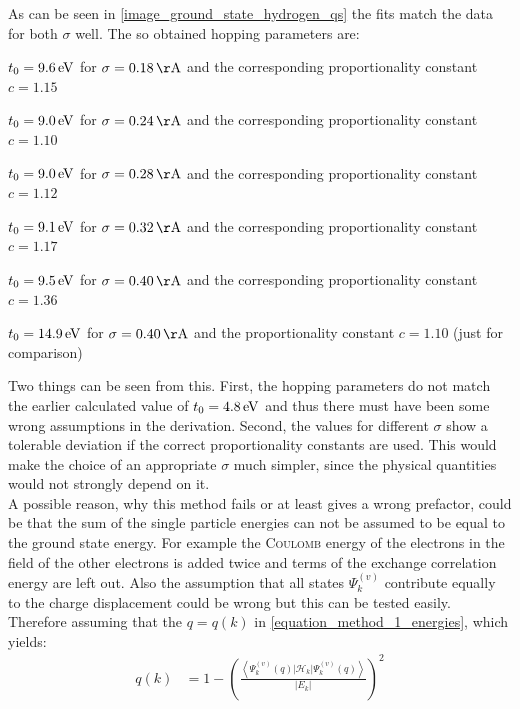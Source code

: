 As can be seen in \cref{image_ground_state_hydrogen_qs} the fits match the data for both $\sigma$ well. The so obtained hopping parameters are:
\begin{compactitem}
	\item $t_0 = \unit[9.6]{eV}$ for $\sigma = \unit[0.18]{\AA}$ and the corresponding proportionality constant $c = 1.15$
	\item $t_0 = \unit[9.0]{eV}$ for $\sigma = \unit[0.24]{\AA}$ and the corresponding proportionality constant $c = 1.10$
	\item $t_0 = \unit[9.0]{eV}$ for $\sigma = \unit[0.28]{\AA}$ and the corresponding proportionality constant $c = 1.12$
	\item $t_0 = \unit[9.1]{eV}$ for $\sigma = \unit[0.32]{\AA}$ and the corresponding proportionality constant $c = 1.17$
	\item $t_0 = \unit[9.5]{eV}$ for $\sigma = \unit[0.40]{\AA}$ and the corresponding proportionality constant $c = 1.36$
	\item $t_0 = \unit[14.9]{eV}$ for $\sigma = \unit[0.40]{\AA}$ and the proportionality constant $c = 1.10$ (just for comparison)
\end{compactitem}
Two things can be seen from this. First, the hopping parameters do not match the earlier calculated value of $t_0 = \unit[4.8]{eV}$ and thus there must have been some wrong assumptions in the derivation. Second, the values for different $\sigma$ show a tolerable deviation if the correct proportionality constants are used. This would make the choice of an appropriate $\sigma$ much simpler, since the physical quantities would not strongly depend on it.\\
A possible reason, why this method fails or at least gives a wrong prefactor, could be that the sum of the single particle energies can not be assumed to be equal to the ground state energy. For example the \textsc{Coulomb} energy of the electrons in the field of the other electrons is added twice and terms of the exchange correlation energy are left out. Also the assumption that all states $\Psi_k^{(v)}$ contribute equally to the charge displacement could be wrong but this can be tested easily. Therefore assuming that the $q = q(k)$ in \cref{equation_method_1_energies}, which yields:
\begin{align}
	q(k) &= 1 - \left(\frac{\left\langle\Psi_k^{(v)}(q)\Big|\mathcal{H}_{k}\Big|\Psi_k^{(v)}(q)\right\rangle}{\left|E_k\right|}\right)^2
\end{align}
